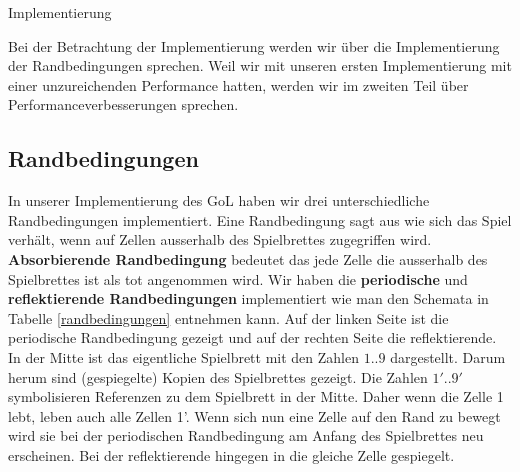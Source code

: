 \documentclass[runningheads]{llncs}
\begin{document}
\begin{section}{Implementierung}
    
    Bei der Betrachtung der Implementierung werden wir über die Implementierung der Randbedingungen sprechen.
    Weil wir mit unseren ersten Implementierung mit einer unzureichenden Performance hatten,
    werden wir im zweiten Teil über Performanceverbesserungen sprechen.
   
    

    \subsection{Randbedingungen}
        In unserer Implementierung des GoL haben wir drei unterschiedliche Randbedingungen implementiert.
        Eine Randbedingung sagt aus wie sich das Spiel verhält, wenn auf Zellen ausserhalb des Spielbrettes zugegriffen wird. \newline
        \textbf{Absorbierende Randbedingung} bedeutet das jede Zelle die ausserhalb des Spielbrettes ist als tot angenommen wird.\newline
        Wir haben die \textbf{periodische} und \textbf{reflektierende Randbedingungen} implementiert wie man den Schemata in Tabelle \ref{randbedingungen} entnehmen kann.
        Auf der linken Seite ist die periodische Randbedingung gezeigt und auf der rechten Seite die reflektierende.
        In der Mitte ist das eigentliche Spielbrett mit den Zahlen $1..9$ dargestellt.
        Darum herum sind (gespiegelte) Kopien des Spielbrettes gezeigt.
        Die Zahlen $1'..9'$ symbolisieren Referenzen zu dem Spielbrett in der Mitte.
        Daher wenn die Zelle 1 lebt, leben auch alle Zellen 1'.
        Wenn sich nun eine Zelle auf den Rand zu bewegt wird sie bei der periodischen Randbedingung am Anfang des Spielbrettes neu erscheinen.
        Bei der reflektierende hingegen in die gleiche Zelle gespiegelt.



\end{section}
\end{document}
